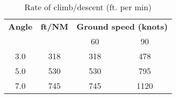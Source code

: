 {}

{}

\begin{table}[ht]
    \caption{Rate of climb/descent (ft. per min)}

    \begin{center}
        \begin{tabular}{cccc}
            \toprule
            \textbf{Angle}   & \textbf{ft/NM} & \multicolumn{2}{c}{\textbf{Ground speed (knots)}}
            \\\cmidrule(lr){3-4}
                             &                & 60                                                & 90   \\
            \midrule
            3.0\textdegree{} & 318            & 318                                               & 478  \\
            5.0\textdegree{} & 530            & 530                                               & 795  \\
            7.0\textdegree{} & 745            & 745                                               & 1120 \\
            \bottomrule
        \end{tabular}
    \end{center}
\end{table}

{}


